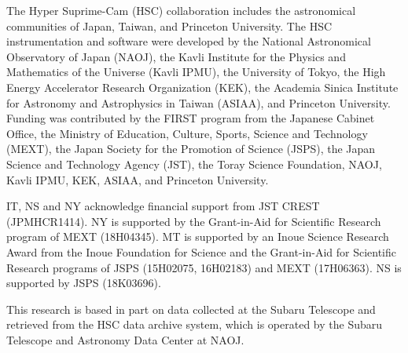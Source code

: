\documentclass[useamsfonts]{pasj01}
\begin{document}
\begin{ack}
The Hyper Suprime-Cam (HSC) collaboration includes the astronomical communities of Japan, Taiwan, and Princeton University. The HSC instrumentation and software were developed by the National Astronomical Observatory of Japan (NAOJ), the Kavli Institute for the Physics and Mathematics of the Universe (Kavli IPMU), the University of Tokyo, the High Energy Accelerator Research Organization (KEK), the Academia Sinica Institute for Astronomy and Astrophysics in Taiwan (ASIAA), and Princeton University. Funding was contributed by the FIRST program from the Japanese Cabinet Office, the Ministry of Education, Culture, Sports, Science and Technology (MEXT), the Japan Society for the Promotion of Science (JSPS), the Japan Science and Technology Agency (JST), the Toray Science Foundation, NAOJ, Kavli IPMU, KEK, ASIAA, and Princeton University.

IT, NS and NY acknowledge financial support from JST CREST (JPMHCR1414). NY is supported by the Grant-in-Aid for Scientific Research program of MEXT (18H04345). MT is supported by an Inoue Science Research Award from the Inoue Foundation for Science and the Grant-in-Aid for Scientific Research programs of JSPS (15H02075, 16H02183) and MEXT (17H06363).  NS is supported by JSPS (18K03696).

This research is based in part on data collected at the Subaru Telescope and retrieved from the HSC data archive system, which is operated by the Subaru Telescope and Astronomy Data Center at NAOJ.
\end{ack}
%


%
\end{document}

